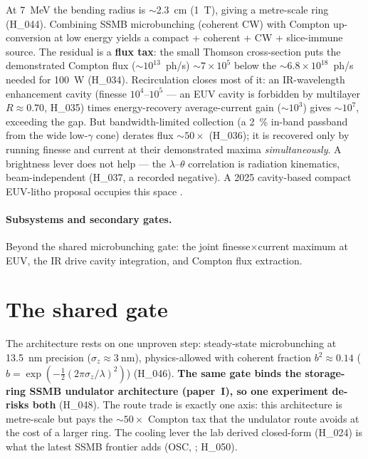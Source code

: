 \documentclass[11pt,a4paper]{article}
\newcommand{\hyp}[1]{\textcolor{blue!45!black}{\textsf{\small #1}}}
\begin{document}
At \SI{7}{\mega\electronvolt} the bending radius is $\sim$\SI{2.3}{\centi\meter} (\SI{1}{\tesla}),
giving a metre-scale ring (\hyp{H\_044}). Combining SSMB microbunching (coherent CW) with Compton
up-conversion at low energy yields a compact + coherent + CW + slice-immune source. The residual is a
\textbf{flux tax}: the small Thomson cross-section puts the demonstrated Compton flux
($\sim\!10^{13}$~ph/s) $\sim\!7\times10^{5}$ below the $\sim\!6.8\times10^{18}$~ph/s needed for
\SI{100}{\watt} (\hyp{H\_034}). Recirculation closes most of it: an IR-wavelength enhancement cavity
(finesse $10^{4}$--$10^{5}$ --- an EUV cavity is forbidden by multilayer $R\!\approx\!0.70$,
\hyp{H\_035}) times energy-recovery average-current gain ($\sim\!10^{3}$) gives $\sim\!10^{7}$,
exceeding the gap. But bandwidth-limited collection (a \SI{2}{\percent} in-band passband from the
wide low-$\gamma$ cone) derates flux $\sim\!50\times$ (\hyp{H\_036}); it is recovered only by running
finesse and current at their demonstrated maxima \emph{simultaneously}. A brightness lever does not
help --- the $\lambda$--$\theta$ correlation is radiation kinematics, beam-independent (\hyp{H\_037},
a recorded negative). A 2025 cavity-based compact EUV-litho proposal occupies this space
\citep{he2025}.

\paragraph{Subsystems and secondary gates.} Beyond the shared microbunching gate: the joint
finesse$\times$current maximum at EUV, the IR drive cavity integration, and Compton flux extraction.

\section{The shared gate}
\label{sec:gate}
The architecture rests on one unproven step: steady-state microbunching at \SI{13.5}{\nano\meter}
precision ($\sigma_z\!\approx\!\SI{3}{\nano\meter}$), physics-allowed with coherent fraction
$b^2\approx0.14$ ($b=\exp(-\tfrac{1}{2}(2\pi\sigma_z/\lambda)^2)$) (\hyp{H\_046}). \textbf{The same
gate binds the storage-ring SSMB undulator architecture (paper~I), so one experiment de-risks both}
(\hyp{H\_048}). The route trade is exactly one axis: this architecture is metre-scale but pays the
$\sim\!50\times$ Compton tax that the undulator route avoids at the cost of a larger ring. The
cooling lever the lab derived closed-form (\hyp{H\_024}) is what the latest SSMB frontier adds (OSC,
\citep{deng2025}; \hyp{H\_050}).
\end{document}
